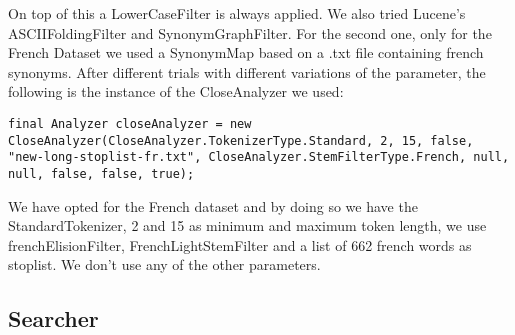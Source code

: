 On top of this a LowerCaseFilter is always applied.
\newline
We also tried Lucene's ASCIIFoldingFilter and SynonymGraphFilter. For the second one, only for the French Dataset we used a SynonymMap based on a .txt file containing french synonyms.
\newline
After different trials with different variations of the parameter, the following is the instance of the CloseAnalyzer we used:

\begin{lstlisting}
final Analyzer closeAnalyzer = new CloseAnalyzer(CloseAnalyzer.TokenizerType.Standard, 2, 15, false, "new-long-stoplist-fr.txt", CloseAnalyzer.StemFilterType.French, null, null, false, false, true);
\end{lstlisting}
We have opted for the French dataset and by doing so we have the StandardTokenizer, 2 and 15 as minimum and maximum token length, we use frenchElisionFilter, FrenchLightStemFilter and a list of 662 french words as stoplist. We don't use any of the other parameters.




\subsection{Searcher}
